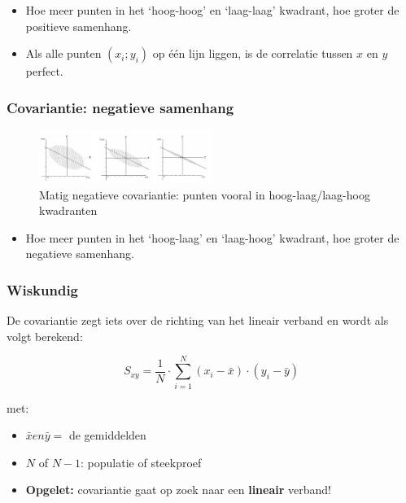 \documentclass{article}
\begin{document}
\begin{itemize}
    \item Hoe meer punten in het `hoog-hoog' en `laag-laag' kwadrant, hoe groter de positieve samenhang.
    \item Als alle punten $(x_i; y_i)$ op één lijn liggen, is de correlatie tussen $x$ en $y$ perfect.
\end{itemize}

\subsubsection{Covariantie: negatieve samenhang}


\begin{figure}[H]
    \centering
    \includegraphics[width=0.5\textwidth]{covariantie-negatieve-samenhang.png}
    \caption{Matig negatieve covariantie: punten vooral in hoog-laag/laag-hoog kwadranten}
\end{figure}

\begin{itemize}
    \item Hoe meer punten in het `hoog-laag' en `laag-hoog' kwadrant, hoe groter de negatieve samenhang.
\end{itemize}

\subsubsection{Wiskundig}

De covariantie zegt iets over de richting van het lineair verband en wordt als volgt berekend:

\begin{equation}
S_{xy} = \frac{1}{N} \cdot \sum_{i=1}^N (x_i - \bar{x}) \cdot (y_i - \bar{y})
\end{equation}

met:

\begin{itemize}
    \item $\bar{x} en \bar{y} =$ de gemiddelden
    \item $N$ of $N-1$: populatie of steekproef
    \item \textbf{Opgelet:} covariantie gaat op zoek naar een \textbf{lineair} verband!
\end{itemize}
\end{document}
